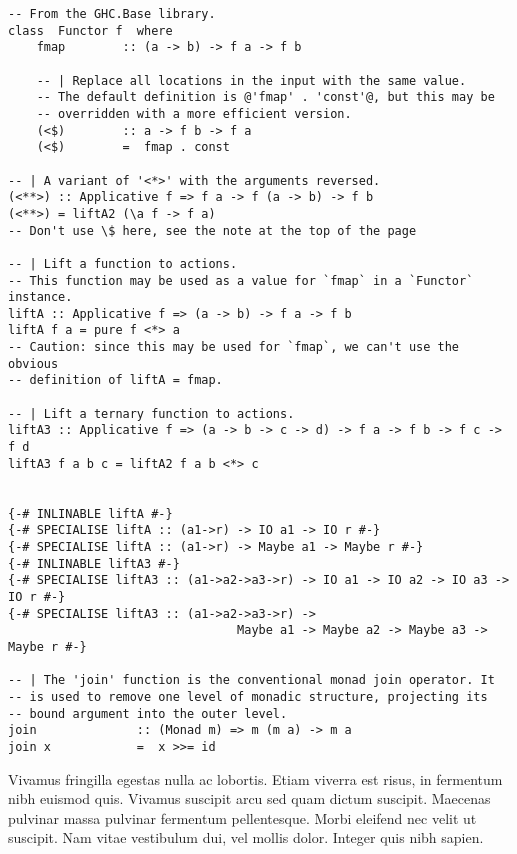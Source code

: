 \documentclass[oneside,openright,titlepage,numbers=noenddot,openany,headinclude,footinclude=true,
cleardoublepage=empty,abstract=false,BCOR=5mm,paper=a4,fontsize=12pt,main=spanish]{scrreprt}
\begin{document}
\begin{verbatim}
-- From the GHC.Base library.
class  Functor f  where
    fmap        :: (a -> b) -> f a -> f b

    -- | Replace all locations in the input with the same value.
    -- The default definition is @'fmap' . 'const'@, but this may be
    -- overridden with a more efficient version.
    (<$)        :: a -> f b -> f a
    (<$)        =  fmap . const

-- | A variant of '<*>' with the arguments reversed.
(<**>) :: Applicative f => f a -> f (a -> b) -> f b
(<**>) = liftA2 (\a f -> f a)
-- Don't use \$ here, see the note at the top of the page

-- | Lift a function to actions.
-- This function may be used as a value for `fmap` in a `Functor` instance.
liftA :: Applicative f => (a -> b) -> f a -> f b
liftA f a = pure f <*> a
-- Caution: since this may be used for `fmap`, we can't use the obvious
-- definition of liftA = fmap.

-- | Lift a ternary function to actions.
liftA3 :: Applicative f => (a -> b -> c -> d) -> f a -> f b -> f c -> f d
liftA3 f a b c = liftA2 f a b <*> c


{-# INLINABLE liftA #-}
{-# SPECIALISE liftA :: (a1->r) -> IO a1 -> IO r #-}
{-# SPECIALISE liftA :: (a1->r) -> Maybe a1 -> Maybe r #-}
{-# INLINABLE liftA3 #-}
{-# SPECIALISE liftA3 :: (a1->a2->a3->r) -> IO a1 -> IO a2 -> IO a3 -> IO r #-}
{-# SPECIALISE liftA3 :: (a1->a2->a3->r) ->
                                Maybe a1 -> Maybe a2 -> Maybe a3 -> Maybe r #-}

-- | The 'join' function is the conventional monad join operator. It
-- is used to remove one level of monadic structure, projecting its
-- bound argument into the outer level.
join              :: (Monad m) => m (m a) -> m a
join x            =  x >>= id
\end{verbatim}

Vivamus fringilla egestas nulla ac lobortis. Etiam viverra est risus,
in fermentum nibh euismod quis. Vivamus suscipit arcu sed quam dictum
suscipit. Maecenas pulvinar massa pulvinar fermentum
pellentesque. Morbi eleifend nec velit ut suscipit. Nam vitae
vestibulum dui, vel mollis dolor. Integer quis nibh sapien.




{}
   
\end{document}
